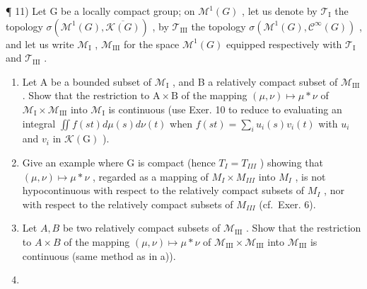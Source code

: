 ¶ 11) Let G be a locally compact group; on \(\mathcal{M}^{1}(G)\) , let us denote by \(\mathcal{T}_{\mathrm{I}}\) the topology \(\sigma(\mathcal{M}^{1}(G), \overline{\mathcal{K}(G)})\) , by \(\mathcal{T}_{\mathrm{III}}\) the topology \(\sigma(\mathcal{M}^{1}(G), \mathcal{C}^{\infty}(G))\) , and let us write \(\mathcal{M}_{\mathrm{I}}\) , \(\mathcal{M}_{\mathrm{III}}\) for the space \(\mathcal{M}^{1}(G)\) equipped respectively with \(\mathcal{T}_{\mathrm{I}}\) and \(\mathcal{T}_{\mathrm{III}}\) .

\begin{enumerate}
\def\labelenumi{\alph{enumi})}
\item
  Let A be a bounded subset of \(\mathcal{M}_{\mathrm{I}}\) , and B a relatively compact subset of \(\mathcal{M}_{\mathrm{III}}\) . Show that the restriction to \(\mathrm{A} \times \mathrm{B}\) of the mapping \((\mu, \nu) \mapsto \mu * \nu\) of \(\mathcal{M}_{\mathrm{I}} \times \mathcal{M}_{\mathrm{III}}\) into \(\mathcal{M}_{\mathrm{I}}\) is continuous (use Exer. 10 to reduce to evaluating an integral \(\iint f(st) d\mu(s) d\nu(t)\) when \(f(st) = \sum_{i} u_{i}(s)v_{i}(t)\) with \(u_{i}\) and \(v_{i}\) in \(\mathcal{K}(\mathrm{G})\) ).
\item
  Give an example where G is compact (hence \(T_{I} = T_{III}\) ) showing that \((\mu, \nu) \mapsto \mu * \nu\) , regarded as a mapping of \(M_{I} \times M_{III}\) into \(M_{I}\) , is not hypocontinuous with respect to the relatively compact subsets of \(M_{I}\) , nor with respect to the relatively compact subsets of \(M_{III}\) (cf.~Exer. 6).
\item
  Let \(A, B\) be two relatively compact subsets of \(\mathcal{M}_{\mathrm{III}}\) . Show that the restriction to \(A \times B\) of the mapping \((\mu, \nu) \mapsto \mu * \nu\) of \(\mathcal{M}_{\mathrm{III}} \times \mathcal{M}_{\mathrm{III}}\) into \(\mathcal{M}_{\mathrm{III}}\) is continuous (same method as in a)).
\item

\end{enumerate}
